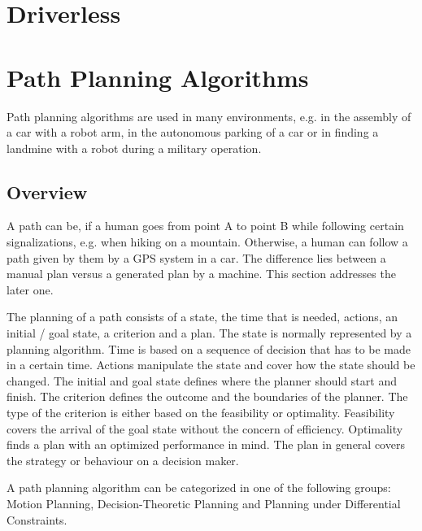 \section{Driverless} \label{sec:Driverless}
\lipsum[1]

\section{Path Planning Algorithms} \label{sec:Path Planning Algorithms}
Path planning algorithms are used in many environments, e.g. in the assembly of a car with a robot arm, in the autonomous parking of a car or in finding a landmine with a robot during a military operation.

\subsection{Overview} \label{sec:Overview Path Planning Algorithms}
A path can be, if a human goes from point A to point B while following certain signalizations, e.g. when hiking on a mountain. Otherwise, a human can follow a path given by them by a GPS system in a car. The difference lies between a manual plan versus a generated plan by a machine. This section addresses the later one.

The planning of a path consists of a state, the time that is needed, actions, an initial / goal state, a criterion and a plan. The state is normally represented by a planning algorithm. Time is based on a sequence of decision that has to be made in a certain time. Actions manipulate the state and cover how the state should be changed. The initial and goal state defines where the planner should start and finish.
The criterion defines the outcome and the boundaries of the planner. The type of the criterion is either based on the feasibility or optimality. Feasibility covers the arrival of the goal state without the concern of efficiency. Optimality finds a plan with an optimized performance in mind. The plan in general covers the strategy or behaviour on a decision maker. \cite{planning_algorithms_steven_m_lavalle}

A path planning algorithm can be categorized in one of the following groups: Motion Planning, Decision-Theoretic Planning and Planning under Differential Constraints.
\cite{planning_algorithms_steven_m_lavalle}


